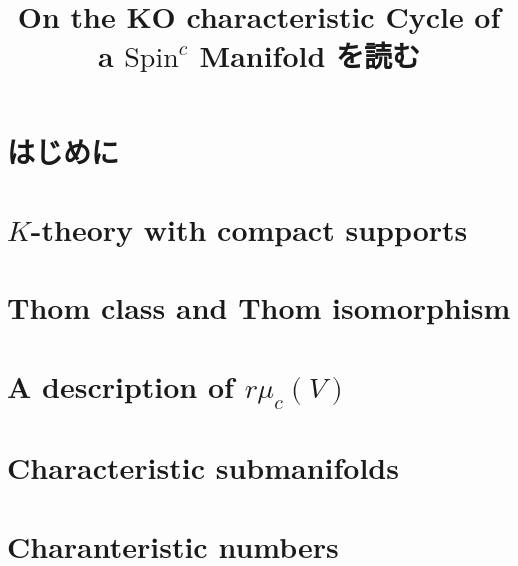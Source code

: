 \documentclass[dvipdfmx]{jsarticle}
\title{On the KO characteristic Cycle of a \(\text{Spin}^c\) Manifold を読む}
\date{}
\begin{document}
\section*{はじめに}


%
\newpage
\section{\(K\)-theory with compact supports}


\newpage
\section{Thom class and Thom isomorphism}


\newpage
\section{A description of \(r\mu_c(V)\)}


\newpage
\section{Characteristic submanifolds}


\newpage
\section{Charanteristic numbers}

\end{document}
